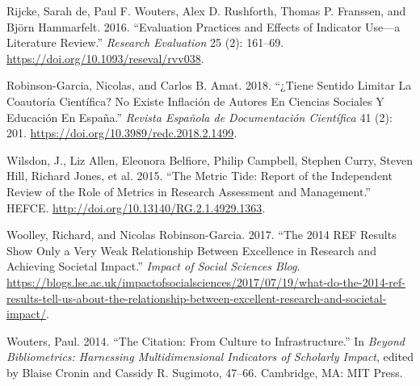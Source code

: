 \documentclass[]{elsarticle} %
\begin{document}
\leavevmode\hypertarget{ref-rijckeEvaluationPracticesEffects2016}{}%
Rijcke, Sarah de, Paul F. Wouters, Alex D. Rushforth, Thomas P.
Franssen, and Björn Hammarfelt. 2016. ``Evaluation Practices and Effects
of Indicator Use---a Literature Review.'' \emph{Research Evaluation} 25
(2): 161--69. \url{https://doi.org/10.1093/reseval/rvv038}.

\leavevmode\hypertarget{ref-robinson-garciaTieneSentidoLimitar2018}{}%
Robinson-Garcia, Nicolas, and Carlos B. Amat. 2018. ``¿Tiene Sentido
Limitar La Coautoría Científica? No Existe Inflación de Autores En
Ciencias Sociales Y Educación En España.'' \emph{Revista Española de
Documentación Científica} 41 (2): 201.
\url{https://doi.org/10.3989/redc.2018.2.1499}.

\leavevmode\hypertarget{ref-wilsdonMetricTideReport2015}{}%
Wilsdon, J., Liz Allen, Eleonora Belfiore, Philip Campbell, Stephen
Curry, Steven Hill, Richard Jones, et al. 2015. ``The Metric Tide:
Report of the Independent Review of the Role of Metrics in Research
Assessment and Management.'' HEFCE.
\url{http://doi.org/10.13140/RG.2.1.4929.1363}.

\leavevmode\hypertarget{ref-woolley2014REFResults2017}{}%
Woolley, Richard, and Nicolas Robinson-Garcia. 2017. ``The 2014 REF
Results Show Only a Very Weak Relationship Between Excellence in
Research and Achieving Societal Impact.'' \emph{Impact of Social
Sciences Blog}.
\url{https://blogs.lse.ac.uk/impactofsocialsciences/2017/07/19/what-do-the-2014-ref-results-tell-us-about-the-relationship-between-excellent-research-and-societal-impact/}.

\leavevmode\hypertarget{ref-woutersCitationCultureInfrastructure2014}{}%
Wouters, Paul. 2014. ``The Citation: From Culture to Infrastructure.''
In \emph{Beyond Bibliometrics: Harnessing Multidimensional Indicators of
Scholarly Impact}, edited by Blaise Cronin and Cassidy R. Sugimoto,
47--66. Cambridge, MA: MIT Press.
\end{document}
